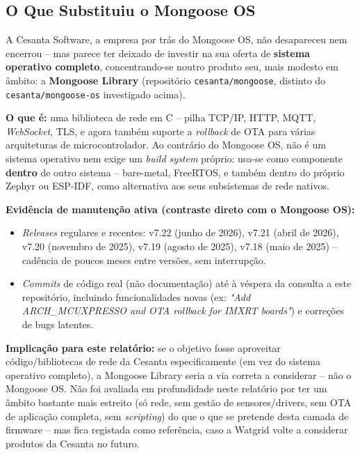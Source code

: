 \documentclass[a4paper,12pt]{article}
\begin{document}
\subsection{O Que Substituiu o Mongoose OS}
A Cesanta Software, a empresa por trás do Mongoose OS, não desapareceu nem encerrou -- mas parece ter deixado de investir na sua oferta de \textbf{sistema operativo completo}, concentrando-se noutro produto seu, mais modesto em âmbito: a \textbf{Mongoose Library} (repositório \texttt{cesanta/mongoose}, distinto do \texttt{cesanta/mongoose-os} investigado acima).

\textbf{O que é:} uma biblioteca de rede em C -- pilha TCP/IP, HTTP, MQTT, \textit{WebSocket}, TLS, e agora também suporte a \textit{rollback} de OTA para várias arquiteturas de microcontrolador. Ao contrário do Mongoose OS, não é um sistema operativo nem exige um \textit{build system} próprio: usa-se como componente \textbf{dentro} de outro sistema -- bare-metal, FreeRTOS, e também dentro do próprio Zephyr ou ESP-IDF, como alternativa aos seus subsistemas de rede nativos.

\textbf{Evidência de manutenção ativa (contraste direto com o Mongoose OS):}
\begin{itemize}
    \item \textit{Releases} regulares e recentes: v7.22 (junho de 2026), v7.21 (abril de 2026), v7.20 (novembro de 2025), v7.19 (agosto de 2025), v7.18 (maio de 2025) -- cadência de poucos meses entre versões, sem interrupção.
    \item \textit{Commits} de código real (não documentação) até à véspera da consulta a este repositório, incluindo funcionalidades novas (ex: \textit{"Add ARCH\_MCUXPRESSO and OTA rollback for IMXRT boards"}) e correções de bugs latentes.
\end{itemize}

\textbf{Implicação para este relatório:} se o objetivo fosse aproveitar código/bibliotecas de rede da Cesanta especificamente (em vez do sistema operativo completo), a Mongoose Library seria a via correta a considerar -- não o Mongoose OS. Não foi avaliada em profundidade neste relatório por ter um âmbito bastante mais estreito (só rede, sem gestão de sensores/drivers, sem OTA de aplicação completa, sem \textit{scripting}) do que o que se pretende desta camada de firmware -- mas fica registada como referência, caso a Watgrid volte a considerar produtos da Cesanta no futuro.
\end{document}
